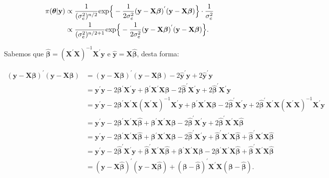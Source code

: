 \documentclass[12pt, oldfontcommands]{article}\usepackage[]{graphicx}\usepackage[]{color}
\begin{document}
\begin{align*}
 \pi(\bm{\theta} | \mathbf{y}) & \propto
 \frac{1}{(\sigma_{e}^{2})^{n/2}}
 {\rm exp}\Big\{-\frac{1}{2\sigma_{e}^{2}}
 (\mathbf{y} - \mathbf{X} \bm{\beta})^{'}
 (\mathbf{y} - \mathbf{X} \bm{\beta})\Big\} \cdot
 \frac{1}{\sigma_{e}^{2}} \\ & \propto
 \frac{1}{(\sigma_{e}^{2})^{n/2 + 1}}
 {\rm exp}\Big\{-\frac{1}{2\sigma_{e}^{2}}
 (\mathbf{y} - \mathbf{X} \bm{\beta})^{'}
 (\mathbf{y} - \mathbf{X} \bm{\beta})\Big\}.
\end{align*}

Sabemos que \(\hat{\bm{\beta}} =
              (\mathbf{X}^{'}\mathbf{X})^{-1}\mathbf{X}^{'}\mathbf{y}\)
e \(\hat{\mathbf{y}} = \mathbf{X}\hat{\bm{\beta}}\), desta forma:

\begin{align*}
 (\mathbf{y} - \mathbf{X} \bm{\beta})^{'}
 (\mathbf{y} - \mathbf{X} \bm{\beta}) & =
 (\mathbf{y} - \mathbf{X} \bm{\beta})^{'}
 (\mathbf{y} - \mathbf{X} \bm{\beta})
 - 2\hat{\mathbf{y}}^{'}\mathbf{y} + 2\hat{\mathbf{y}}^{'}\mathbf{y} \\
 & = \mathbf{y}^{'}\mathbf{y} - 2\bm{\beta}^{'}\mathbf{X}^{'}\mathbf{y}
     + \bm{\beta}^{'}\mathbf{X}^{'}\mathbf{X}\bm{\beta}
     - 2\hat{\bm{\beta}}^{'}\mathbf{X}^{'}\mathbf{y}
     + 2\hat{\bm{\beta}}^{'}\mathbf{X}^{'}\mathbf{y} \\ & =
 \mathbf{y}^{'}\mathbf{y} - 2\bm{\beta}^{'}\mathbf{X}^{'}
 \mathbf{X}(\mathbf{X}^{'}\mathbf{X})^{-1}\mathbf{X}^{'}\mathbf{y}
 + \bm{\beta}^{'}\mathbf{X}^{'}\mathbf{X}\bm{\beta}
 - 2\hat{\bm{\beta}}^{'}\mathbf{X}^{'}\mathbf{y}
 + 2\hat{\bm{\beta}}^{'}\mathbf{X}^{'}\mathbf{X}
 (\mathbf{X}^{'}\mathbf{X})^{-1}\mathbf{X}^{'}\mathbf{y} \\ & =
 \mathbf{y}^{'}\mathbf{y}
 - 2\bm{\beta}^{'}\mathbf{X}^{'}\mathbf{X}\hat{\bm{\beta}}
 + \bm{\beta}^{'}\mathbf{X}^{'}\mathbf{X}\bm{\beta}
 - 2\hat{\bm{\beta}}^{'}\mathbf{X}^{'}\mathbf{y}
 + 2\hat{\bm{\beta}}^{'}\mathbf{X}^{'}\mathbf{X}\hat{\bm{\beta}} \\ & =
 \mathbf{y}^{'}\mathbf{y}
 - 2\bm{\beta}^{'}\mathbf{X}^{'}\mathbf{X}\hat{\bm{\beta}}
 + \bm{\beta}^{'}\mathbf{X}^{'}\mathbf{X}\bm{\beta}
 - 2\hat{\bm{\beta}}^{'}\mathbf{X}^{'}\mathbf{y}
 + \hat{\bm{\beta}}^{'}\mathbf{X}^{'}\mathbf{X}\hat{\bm{\beta}}
 + \hat{\bm{\beta}}^{'}\mathbf{X}^{'}\mathbf{X}\hat{\bm{\beta}} \\ & =
 \mathbf{y}^{'}\mathbf{y}
 - 2\hat{\bm{\beta}}^{'}\mathbf{X}^{'}\mathbf{y}
 + \hat{\bm{\beta}}^{'}\mathbf{X}^{'}\mathbf{X}\hat{\bm{\beta}}
 + \bm{\beta}^{'}\mathbf{X}^{'}\mathbf{X}\bm{\beta}
 - 2\bm{\beta}^{'}\mathbf{X}^{'}\mathbf{X}\hat{\bm{\beta}}
 + \hat{\bm{\beta}}^{'}\mathbf{X}^{'}\mathbf{X}\hat{\bm{\beta}} \\ & =
 (\mathbf{y} - \mathbf{X} \hat{\bm{\beta}})^{'}
 (\mathbf{y} - \mathbf{X} \hat{\bm{\beta}})
 + (\bm{\beta} - \hat{\bm{\beta}})^{'}
 \mathbf{X}^{'}\mathbf{X}(\bm{\beta} - \hat{\bm{\beta}}).
\end{align*}
\end{document}
